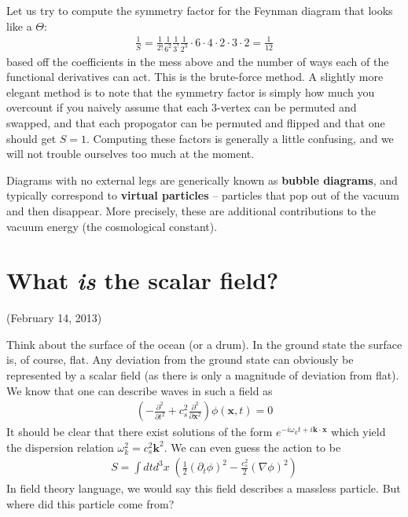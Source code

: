 \documentclass{../mathnotes}
\begin{document}
Let us try to compute the symmetry factor for the Feynman diagram that looks like a $\Theta$:
\begin{align*}
    \frac{1}{S}=\frac{1}{2!}\frac{1}{6^2}\frac{1}{3^!}\frac{1}{2^3}\cdot 6\cdot 4\cdot 2\cdot 3\cdot 2=\frac{1}{12}
\end{align*}
based off the coefficients in the mess above and the number of ways each of the functional  derivatives can act. This is the brute-force method.
A slightly more elegant method is to note that the symmetry factor is simply how much you overcount if you naively assume that each 3-vertex can
be permuted and swapped, and that each propogator can be permuted and flipped and that one should get $S=1$. Computing these factors is generally
a little confusing, and we will not trouble ourselves too much at the moment.

Diagrams with no external legs are generically known as \textbf{bubble diagrams}, and typically correspond to \textbf{virtual particles} -- particles that
pop out of the vacuum and then disappear. More precisely, these are additional contributions to the vacuum energy (the cosmological constant).


\section*{What \textit{is} the scalar field?}

(February 14, 2013)

Think about the surface of the ocean (or a drum). In the ground state the surface is, of course, flat. Any deviation from the ground state
can obviously be represented by a scalar field (as there is only a magnitude of deviation from flat). We know that one can describe
waves in such a field as 
\begin{align*}
    \left(-\frac{\partial^2}{\partial t^2}+c_s^2\frac{\partial^2}{\partial \mathbf{x}^2}\right)\phi(\mathbf{x},t)=0
\end{align*}
It should be clear that there exist solutions of the form $e^{-i\omega_kt +i\mathbf{k}\cdot\mathbf{x}}$ which yield the dispersion relation $\omega_k^2=c_s^2\mathbf{k}^2$.
We can even guess the action to be
\begin{align*}
    S=\int dt d^3x\;\left( \frac{1}{2}(\partial_t\phi)^2-\frac{c_s^2}{2}\left( \nabla \phi \right)^2 \right)
\end{align*}
In field theory language, we would say this field describes a massless particle. But where did this particle come from?
\end{document}
